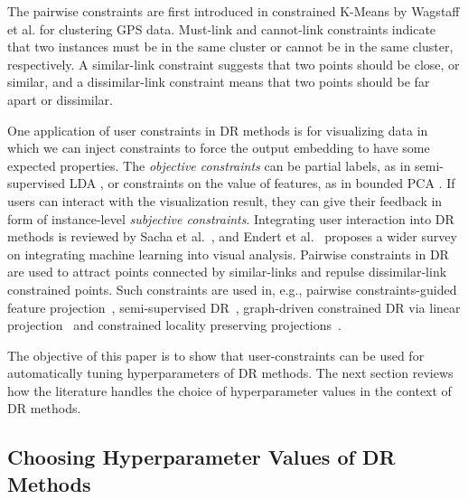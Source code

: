 The pairwise constraints are first introduced in constrained K-Means by Wagstaff et al. \cite{wagstaff2001constrained} for clustering GPS data. Must-link and cannot-link constraints indicate that two instances must be in the same cluster or cannot be in the same cluster, respectively.
A similar-link constraint suggests that two points should be close, or similar, and a dissimilar-link constraint means that two points should be far apart or dissimilar.

One application of user constraints in DR methods is for visualizing data in which we can inject constraints to force the output embedding to have some expected properties.
The \emph{objective constraints} can be partial labels, as in semi-supervised LDA \cite{Sugiyama2008SELF}, or constraints on the value of features, as in bounded PCA \cite{giordani2007bpca}. 
If users can interact with the visualization result, they can give their feedback in form of instance-level \emph{subjective constraints}.
Integrating user interaction into DR methods is reviewed by Sacha et al.~\cite{Sacha2017Interaction}, and Endert et al.~\cite{Endert2017SOTA} proposes a wider survey on integrating machine learning into visual analysis.
Pairwise constraints in DR are used to attract points connected by similar-links and repulse dissimilar-link constrained points. Such constraints are used in, e.g., pairwise constraints-guided feature projection~\cite{tang2007pairwise}, semi-supervised DR~\cite{zhang2007ssdr}, graph-driven constrained DR via linear projection~\cite{davidson2009gcdr} and constrained locality preserving projections~\cite{cevikalp2008CLPP}.

The objective of this paper is to show that user-constraints can be used for automatically tuning hyperparameters of DR methods. The next section reviews how the literature handles the choice of hyperparameter values in the context of DR methods.

\subsection{Choosing Hyperparameter Values of DR Methods}\label{subsec:tune_HP}

